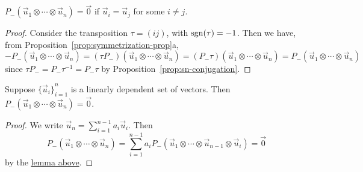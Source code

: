 \begin{lemma}\label{lem:antisym-same-zero}
    \(P_-(\vec{u}_1 \otimes \cdots \otimes \vec{u}_n) = \vec{0}\)
    if \(\vec{u}_i = \vec{u}_j\) for some \(i \neq j\).
\end{lemma}
\begin{proof}
    Consider the transposition \(\tau = (ij)\), with \(\operatorname{sgn}(\tau) = -1\).
    Then we have, from Proposition~\ref{prop:symmetrization-prop}a,
    \begin{equation*}
        -P_-(\vec{u}_1 \otimes \cdots \otimes \vec{u}_n)
        = (\tau P_-)(\vec{u}_1 \otimes \cdots \otimes \vec{u}_n)
        = (P_- \tau)(\vec{u}_1 \otimes \cdots \otimes \vec{u}_n)
        = P_- (\vec{u}_1 \otimes \cdots \otimes \vec{u}_n)
    \end{equation*}
    since \(\tau P_- = P_- \tau^{-1} = P_- \tau\) by Proposition~\ref{prop:sn-conjugation}.
\end{proof}
\begin{theorem}\label{thm:antisym-lin-dep-zero}
    Suppose \({\{\vec{u}_i\}}_{i=1}^n\) is a linearly dependent set of vectors.
    Then \(P_-(\vec{u}_1 \otimes \cdots \otimes \vec{u}_n) = \vec{0}\).
\end{theorem}
\begin{proof}
    We write \(\vec{u}_n = \sum_{i=1}^{n-1} a_i\vec{u}_i\).
    Then
    \begin{equation*}
        P_-(\vec{u}_1 \otimes \cdots \otimes \vec{u}_n)
        = \sum_{i=1}^{n-1} a_i P_-(\vec{u}_1 \otimes \cdots \otimes \vec{u}_{n-1} \otimes \vec{u}_i)
        = \vec{0}
    \end{equation*}
    by the \hyperref[lem:antisym-same-zero]{lemma above}.
\end{proof}

